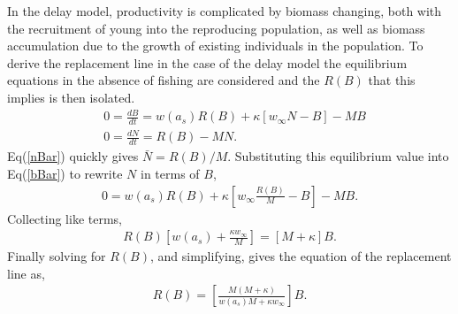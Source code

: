 %
In the delay model, productivity is complicated by biomass changing, both 
with the recruitment of young into the reproducing population, as well as 
biomass accumulation due to the growth of existing individuals in the 
population. To derive the replacement line in the case of the delay model 
the equilibrium equations in the absence of fishing are considered and 
the $R(B)$ that this implies is then isolated.  
%
\begin{align}
&0=\frac{dB}{dt} = w(a_s)R(B) + \kappa \left[w_\infty N-B\right] - MB \label{bBar}\\
&0=\frac{dN}{dt} = R(B) - MN. \label{nBar}
\end{align}
%
Eq(\ref{nBar}) quickly gives $\bar{N} = R(B)/M$. Substituting this equilibrium 
value into Eq(\ref{bBar}) to rewrite $N$ in terms of $B$,
%
\begin{align}
0 = w(a_s)R(B) + \kappa \left[w_\infty \frac{R(B)}{M}-B\right] - MB. %
\end{align}
Collecting like terms, 
\begin{align}
R(B)\left[w(a_s)+\frac{\kappa w_\infty}{M}\right] = \left[M+\kappa\right]B. %
\end{align}
Finally solving for $R(B)$, and simplifying, gives the equation of the replacement line as,  
\begin{align}
R(B) = \left[\frac{M(M+\kappa)}{w(a_s)M+\kappa w_\infty}\right]B. %
\end{align}

